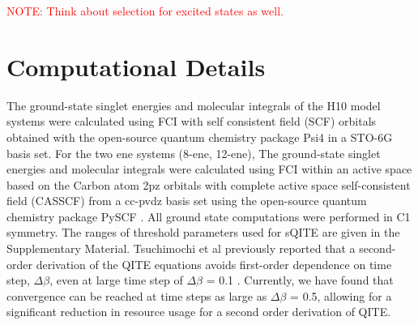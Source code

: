 \documentclass[aip,jcp,amsmath,amssymb, reprint]{revtex4-1}
\newcommand{\note}[2]{%
  \ifthenelse{\boolean{shownotes}}%
    {\textcolor{#1}{#2}}%
    {}%
}
\begin{document}

\note{red}{NOTE: Think about selection for excited states as well.}


\section{Computational Details}
The ground-state singlet energies and molecular integrals of the H10 model systems were calculated using FCI with self consistent field (SCF) orbitals obtained with the open-source quantum chemistry package Psi4 \cite{Parrish2017Psi4, smith2020psi4} in a STO-6G basis set. For the two ene systems (8-ene, 12-ene), The ground-state singlet energies and molecular integrals were calculated using FCI within an active space based on the Carbon atom 2pz orbitals with complete active space self-consistent field (CASSCF) from a cc-pvdz basis set using the open-source quantum chemistry package PySCF \cite{sun2018pyscf}. All ground state computations were performed in C1 symmetry. The ranges of threshold parameters used for sQITE are given in the Supplementary Material. Tsuchimochi et al previously reported that a second-order derivation of the QITE equations avoids first-order dependence on time step, $\Delta\beta$, even at large time step of $\Delta\beta$ = 0.1 \cite{Tsuchimochi2023Improved}. Currently, we have found that convergence can be reached at time steps as large as $\Delta\beta$ = 0.5, allowing for a significant reduction in resource usage for a second order derivation of QITE. 
\end{document}
